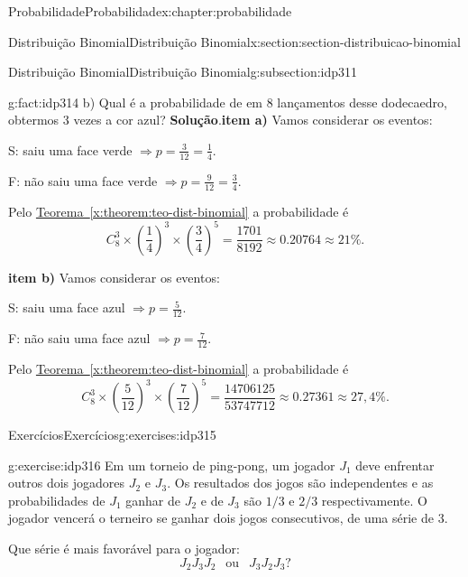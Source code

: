 \documentclass[oneside,10pt,]{book}
\newcommand{\blocktitlefont}{\relax}
\newcommand{\xreffont}{\relax}
\newcommand{\terminology}[1]{\textbf{#1}}
\numberwithin{equation}{section}
\begin{document}
\begin{chapterptx}{Probabilidade}{}{Probabilidade}{}{}{x:chapter:probabilidade}
\begin{sectionptx}{Distribuição Binomial}{}{Distribuição Binomial}{}{}{x:section:section-distribuicao-binomial}
\begin{subsectionptx}{Distribuição Binomial}{}{Distribuição Binomial}{}{}{g:subsection:idp311}
\begin{fact}{}{}{g:fact:idp314}
b) Qual é a probabilidade de em 8 lançamentos desse dodecaedro, obtermos 3 vezes a cor azul?%
\textbf{\blocktitlefont Solução}.\quad{}\terminology{item a)} Vamos considerar os eventos:%
\par
S: saiu uma face verde \(\Rightarrow p = \frac{3}{12} = \frac{1}{4}.\)%
\par
F: não saiu uma face verde \(\Rightarrow p = \frac{9}{12} = \frac{3}{4}.\)%
\par
Pelo \hyperref[x:theorem:teo-dist-binomial]{Teorema~{\xreffont\ref{x:theorem:teo-dist-binomial}}} a probabilidade é%
\begin{equation*}
C_8^3\times \left( \frac{1}{4} \right)^3 \times \left( \frac{3}{4} \right)^5 = \frac{1701}{8192} \approx 0.20764 \approx 21\%. 
\end{equation*}
%
\par
\terminology{item b)} Vamos considerar os eventos:%
\par
S: saiu uma face azul \(\Rightarrow p = \frac{5}{12}.\)%
\par
F: não saiu uma face azul \(\Rightarrow p = \frac{7}{12}.\)%
\par
Pelo \hyperref[x:theorem:teo-dist-binomial]{Teorema~{\xreffont\ref{x:theorem:teo-dist-binomial}}} a probabilidade é%
%
\begin{equation*}
C_8^3\times \left( \frac{5}{12} \right)^3 \times \left( \frac{7}{12} \right)^5 = \frac{14706125}{53747712} \approx 0.27361 \approx 27,4\%. 
\end{equation*}
\end{fact}
\end{subsectionptx}
%
%
\typeout{************************************************}
\typeout{************************************************}
%
\begin{exercises-subsection}{Exercícios}{}{Exercícios}{}{}{g:exercises:idp315}
\begin{divisionexercise}{1}{}{}{g:exercise:idp316}%
Em um torneio de ping-pong, um jogador \(J_1\) deve enfrentar outros dois jogadores \(J_2\) e \(J_3\). Os resultados dos jogos são independentes e as probabilidades de \(J_1\) ganhar de \(J_2\) e de \(J_3\) são \(1/3\) e \(2/3\) respectivamente. O jogador vencerá o terneiro se ganhar dois jogos consecutivos, de uma série de 3.%
\par
Que série é mais favorável para o jogador:%
\begin{equation*}
J_2J_3J_2 ~~\text{ ou }~~ J_3J_2J_3?
\end{equation*}

\end{divisionexercise}
\end{exercises-subsection}
\end{sectionptx}
\end{chapterptx}
\end{document}

